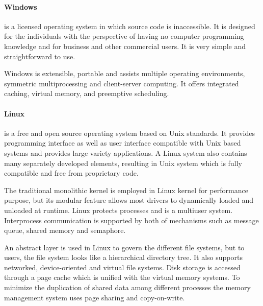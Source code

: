\documentclass[10pt,a4paper,draft]{article}
\begin{document}
\paragraph*{Windows} is a licensed operating system in which source code is inaccessible. It is designed for the individuals with the perspective of having no computer programming knowledge and for business and other commercial users. It is very simple and straightforward to use.

Windows is extensible, portable and assists multiple operating environments, symmetric multiprocessing and client-server computing. It offers integrated caching, virtual memory, and preemptive scheduling.

\paragraph*{Linux} is a free and open source operating system based on Unix standards. It provides programming interface as well as user interface compatible with Unix based systems and provides large variety applications. A Linux system also contains many separately developed elements, resulting in Unix system which is fully compatible and free from proprietary code.

The traditional monolithic kernel is employed in Linux kernel for performance purpose, but its modular feature allows most drivers to dynamically loaded and unloaded at runtime. Linux protects processes and is a multiuser system. Interprocess communication is supported by both of mechanisms such as message queue, shared memory and semaphore.

An abstract layer is used in Linux to govern the different file systems, but to users, the file system looks like a hierarchical directory tree. It also supports networked, device-oriented and virtual file systems. Disk storage is accessed through a page cache which is unified with the virtual memory systems. To minimize the duplication of shared data among different processes the memory management system uses page sharing and copy-on-write.
\end{document}
